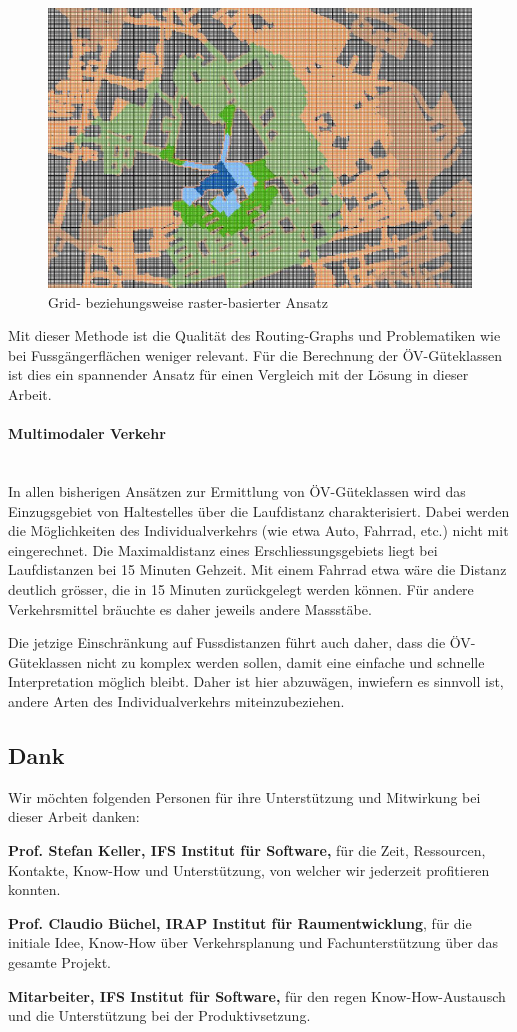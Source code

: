 \begin{figure}[ht]
    \centering
    \includegraphics[width=0.6\linewidth]{start/img/grid_based_approach.png}
    \caption[Grid- beziehungsweise raster-basierter Ansatz]{Grid- beziehungsweise raster-basierter Ansatz~\cite{pedestrian_accessibility_planning}}
    \label{fig:grid_based_approach}
\end{figure}

Mit dieser Methode ist die Qualität des \glspl{Routing-Graph} und Problematiken wie bei Fussgängerflächen weniger relevant.
Für die Berechnung der \gls{ÖV-Güteklassen} ist dies ein spannender Ansatz für einen Vergleich mit der Lösung in dieser Arbeit.

\paragraph{Multimodaler Verkehr}~\\
In allen bisherigen Ansätzen zur Ermittlung von \gls{ÖV-Güteklassen} wird das Einzugsgebiet von \glspl{Haltestelle} über die Laufdistanz charakterisiert.
Dabei werden die Möglichkeiten des Individualverkehrs (wie etwa Auto, Fahrrad, etc.) nicht mit eingerechnet.
Die Maximaldistanz eines Erschliessungsgebiets liegt bei Laufdistanzen bei 15 Minuten Gehzeit.
Mit einem Fahrrad etwa wäre die Distanz deutlich grösser, die in 15 Minuten zurückgelegt werden können.
Für andere Verkehrsmittel bräuchte es daher jeweils andere Massstäbe.

Die jetzige Einschränkung auf Fussdistanzen führt auch daher, dass die \gls{ÖV-Güteklassen} nicht zu komplex werden sollen, damit eine einfache und schnelle Interpretation möglich bleibt.
Daher ist hier abzuwägen, inwiefern es sinnvoll ist, andere Arten des Individualverkehrs miteinzubeziehen.

\subsection{Dank}
\label{Resultate:Dank}

Wir möchten folgenden Personen für ihre Unterstützung und Mitwirkung bei dieser Arbeit danken:

\textbf{Prof. Stefan Keller, IFS Institut für Software,} für die Zeit, Ressourcen, Kontakte, Know-How und Unterstützung, von welcher wir jederzeit profitieren konnten.

\textbf{Prof. Claudio Büchel, IRAP Institut für Raumentwicklung}, für die initiale Idee, Know-How über Verkehrsplanung und Fachunterstützung über das gesamte Projekt.

\textbf{Mitarbeiter, IFS Institut für Software,} für den regen Know-How-Austausch und die Unterstützung bei der Produktivsetzung.
